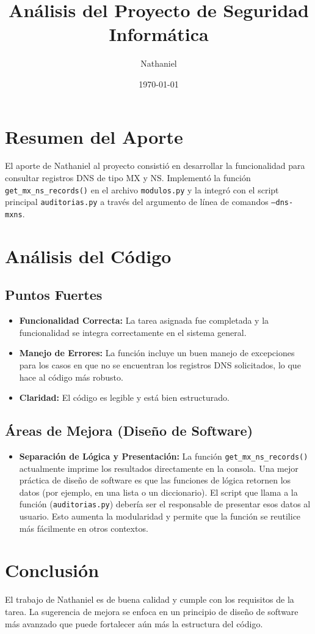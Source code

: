 \documentclass{article}
\title{Análisis del Proyecto de Seguridad Informática}
\author{Nathaniel}
\date{\today}
\begin{document}
\maketitle

\section{Resumen del Aporte}
El aporte de Nathaniel al proyecto consistió en desarrollar la funcionalidad para consultar registros DNS de tipo MX y NS. Implementó la función \texttt{get\_mx\_ns\_records()} en el archivo \texttt{modulos.py} y la integró con el script principal \texttt{auditorias.py} a través del argumento de línea de comandos \texttt{--dns-mxns}.

\section{Análisis del Código}

\subsection{Puntos Fuertes}
\begin{itemize}
    \item \textbf{Funcionalidad Correcta:} La tarea asignada fue completada y la funcionalidad se integra correctamente en el sistema general.
    \item \textbf{Manejo de Errores:} La función incluye un buen manejo de excepciones para los casos en que no se encuentran los registros DNS solicitados, lo que hace al código más robusto.
    \item \textbf{Claridad:} El código es legible y está bien estructurado.
\end{itemize}

\subsection{Áreas de Mejora (Diseño de Software)}
\begin{itemize}
    \item \textbf{Separación de Lógica y Presentación:} La función \texttt{get\_mx\_ns\_records()} actualmente imprime los resultados directamente en la consola. Una mejor práctica de diseño de software es que las funciones de lógica retornen los datos (por ejemplo, en una lista o un diccionario). El script que llama a la función (\texttt{auditorias.py}) debería ser el responsable de presentar esos datos al usuario. Esto aumenta la modularidad y permite que la función se reutilice más fácilmente en otros contextos.
\end{itemize}

\section{Conclusión}
El trabajo de Nathaniel es de buena calidad y cumple con los requisitos de la tarea. La sugerencia de mejora se enfoca en un principio de diseño de software más avanzado que puede fortalecer aún más la estructura del código.
\end{document}
